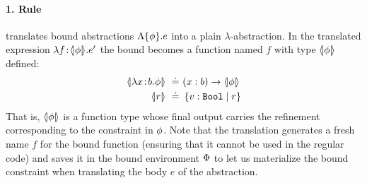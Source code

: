 



\paragraph{1.  Rule~\txCAbs} translates bound abstractions
$\Lambda \{\phi \} . e $ into a plain $\lambda$-abstraction.
%
In the translated expression $\lambda {f\!:\!\ensuremath{\langle\!| \phi |\!\rangle}}. e'$
the bound becomes a function named $f$ with type
$\langle\!| \phi |\!\rangle$ defined:
%
\begin{align*}
\txbound{\efunt{x}{b}{\constraint}} \defeq & \tfun{x}{b}{\txbound{\constraint}}\\
\txbound{r} \defeq & \tref{\tbbool}{r}
\end{align*}
%
That is, $\langle\!| \phi |\!\rangle$ is a function type whose
final output carries the refinement corresponding to
the constraint in $\phi$.
%
Note that the translation generates a fresh name $f$ for
the bound function (ensuring that it cannot be used in
the regular code) and saves it in the bound environment
$\Phi$ to let us materialize the bound constraint when
translating the body $e$ of the abstraction.


